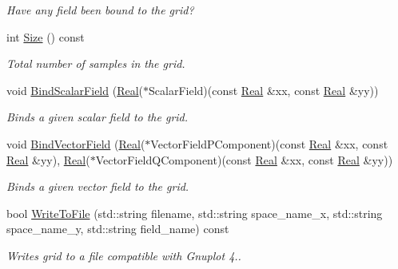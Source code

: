\begin{DoxyCompactItemize}
\begin{DoxyCompactList}\small\item\em Have any field been bound to the grid? \end{DoxyCompactList}\item 
int \hyperlink{classmtk_1_1UniStgGrid2D_a9df5729dc490325c35757422b744bea3}{Size} () const 
\begin{DoxyCompactList}\small\item\em Total number of samples in the grid. \end{DoxyCompactList}\item 
void \hyperlink{classmtk_1_1UniStgGrid2D_a5f9910ffb94e0314b16c026c4b5762ee}{Bind\+Scalar\+Field} (\hyperlink{group__c01-roots_gac080bbbf5cbb5502c9f00405f894857d}{Real}($\ast$Scalar\+Field)(const \hyperlink{group__c01-roots_gac080bbbf5cbb5502c9f00405f894857d}{Real} \&xx, const \hyperlink{group__c01-roots_gac080bbbf5cbb5502c9f00405f894857d}{Real} \&yy))
\begin{DoxyCompactList}\small\item\em Binds a given scalar field to the grid. \end{DoxyCompactList}\item 
void \hyperlink{classmtk_1_1UniStgGrid2D_ae274b24672e9bd6075bf38b015bd9083}{Bind\+Vector\+Field} (\hyperlink{group__c01-roots_gac080bbbf5cbb5502c9f00405f894857d}{Real}($\ast$Vector\+Field\+P\+Component)(const \hyperlink{group__c01-roots_gac080bbbf5cbb5502c9f00405f894857d}{Real} \&xx, const \hyperlink{group__c01-roots_gac080bbbf5cbb5502c9f00405f894857d}{Real} \&yy), \hyperlink{group__c01-roots_gac080bbbf5cbb5502c9f00405f894857d}{Real}($\ast$Vector\+Field\+Q\+Component)(const \hyperlink{group__c01-roots_gac080bbbf5cbb5502c9f00405f894857d}{Real} \&xx, const \hyperlink{group__c01-roots_gac080bbbf5cbb5502c9f00405f894857d}{Real} \&yy))
\begin{DoxyCompactList}\small\item\em Binds a given vector field to the grid. \end{DoxyCompactList}\item 
bool \hyperlink{classmtk_1_1UniStgGrid2D_a1787a79e4bcee6b89c681dc7e5e2d7bc}{Write\+To\+File} (std\+::string filename, std\+::string space\+\_\+name\+\_\+x, std\+::string space\+\_\+name\+\_\+y, std\+::string field\+\_\+name) const 
\begin{DoxyCompactList}\small\item\em Writes grid to a file compatible with Gnuplot 4.. \end{DoxyCompactList}\end{DoxyCompactItemize}
